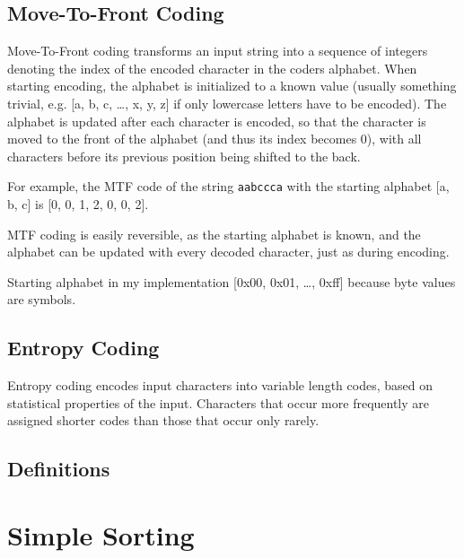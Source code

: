 \documentclass[a4paper]{scrreprt}
\begin{document}
\section{Move-To-Front Coding}

Move-To-Front coding transforms an input string into a sequence of integers
denoting the index of the encoded character in the coders alphabet. When
starting encoding, the alphabet is initialized to a known value (usually
something trivial, e.g. [a, b, c, \ldots, x, y, z] if only lowercase letters
have to be encoded). The alphabet is updated after each character is encoded, so
that the character is moved to the front of the alphabet (and thus its index
becomes 0), with all characters before its previous position being shifted to
the back.

For example, the MTF code of the string \texttt{aabccca} with the starting
alphabet [a, b, c] is [0, 0, 1, 2, 0, 0, 2].

MTF coding is easily reversible, as the starting alphabet is known, and the
alphabet can be updated with every decoded character, just as during encoding.

Starting alphabet in my implementation [0x00, 0x01, \ldots, 0xff] because byte
values are symbols.

\section{Entropy Coding}

Entropy coding encodes input characters into variable length codes, based on
statistical properties of the input. Characters that occur more frequently are
assigned shorter codes than those that occur only rarely.


\section{Definitions}

\chapter{Simple Sorting}
\end{document}
